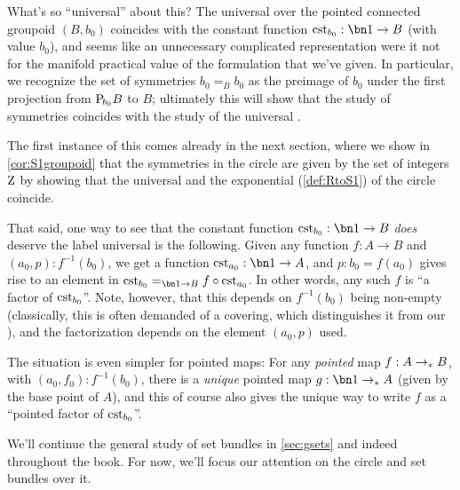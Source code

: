 \begin{remark}
  What's so ``universal'' about this?
The universal \covering over the pointed connected groupoid $(B,b_0)$ coincides with the constant function $\cst{b_0}:\bn 1\to B$ (with value $b_0$), and seems like an unnecessary complicated representation were it not for the manifold practical value of the formulation that we've given.
In particular, we recognize the set of symmetries $b_0=_Bb_0$ as the preimage of $b_0$ under the first projection from ${\mathrm{P}_{\!b_0}}B$ to $B$; ultimately this will show that the study of symmetries coincides with the study of the universal \covering.

The first instance of this comes already in the next section, where we show in \cref{cor:S1groupoid} that the symmetries in the circle are given by the set of integers $\mathrm{Z}$ by showing that the universal \covering and the exponential \covering (\cref{def:RtoS1}) of the circle coincide.

That said, one way to see that the constant function $\cst{b_0}:\bn 1\to B$
\emph{does} deserve the label universal is the following.
Given any function $f:A\to B$ and $(a_0,p): f^{-1}(b_0)$,
we get a function $\cst{a_0}:\bn 1\to A$, and $p:b_0=f(a_0)$ gives rise to
an element in $\cst{b_0}=_{\bn 1\to B}f \circ \cst{a_0}$.
In other words, any such $f$ is ``a factor of $\cst{b_0}$''.
Note, however, that this depends on $f^{-1}(b_0)$ being non-empty
(classically, this is often demanded of a covering, which distinguishes it from our \coverings),
and the factorization depends on the element $(a_0,p)$ used.

The situation is even simpler for pointed maps:
For any \emph{pointed} map $f : A \to_\ast B$, with $(a_0,f_0):f^{-1}(b_0)$,
there is a \emph{unique} pointed map $g : \bn 1 \ptdto A$
(given by the base point of $A$), and this of course also gives
the unique way to write $f$ as a ``pointed factor of $\cst{b_0}$''.
\end{remark}

We'll continue the general study of set bundles in \cref{sec:gsets}
and indeed throughout the book.
For now, we'll focus our attention on the circle and set bundles over it.

